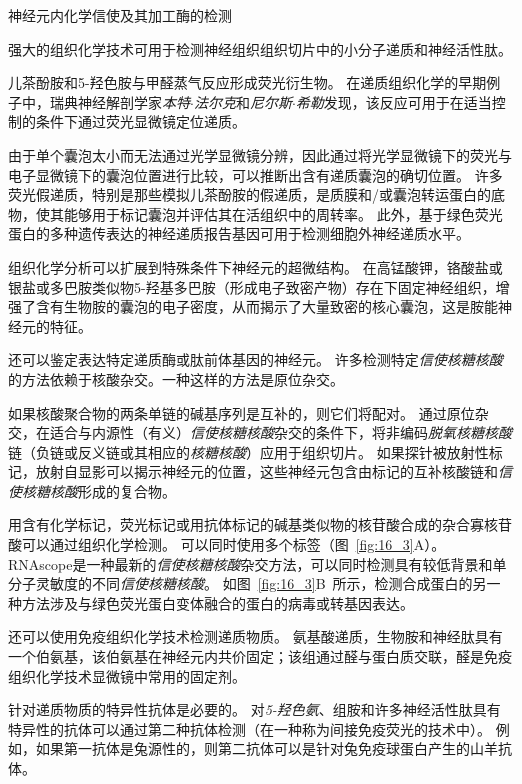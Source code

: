 \begin{proposition}[神经解剖学导航术语] \label{box:16_2}
	
	\quad \quad 神经元内化学信使及其加工酶的检测
	
	\quad \quad 强大的组织化学技术可用于检测神经组织组织切片中的小分子递质和神经活性肽。
	
	\quad \quad 儿茶酚胺和5-羟色胺与甲醛蒸气反应形成荧光衍生物。
	在递质组织化学的早期例子中，瑞典神经解剖学家\textit{本特$\cdot$法尔克}和\textit{尼尔斯$\cdot$希勒}发现，该反应可用于在适当控制的条件下通过荧光显微镜定位递质。
	
	\quad \quad 由于单个囊泡太小而无法通过光学显微镜分辨，因此通过将光学显微镜下的荧光与电子显微镜下的囊泡位置进行比较，可以推断出含有递质囊泡的确切位置。
	许多荧光假递质，特别是那些模拟儿茶酚胺的假递质，是质膜和/或囊泡转运蛋白的底物，使其能够用于标记囊泡并评估其在活组织中的周转率。
	此外，基于绿色荧光蛋白的多种遗传表达的神经递质报告基因可用于检测细胞外神经递质水平。
	
	\quad \quad 组织化学分析可以扩展到特殊条件下神经元的超微结构。
	在高锰酸钾，铬酸盐或银盐或多巴胺类似物5-羟基多巴胺（形成电子致密产物）存在下固定神经组织，增强了含有生物胺的囊泡的电子密度，从而揭示了大量致密的核心囊泡，这是胺能神经元的特征。
	
	\quad \quad 还可以鉴定表达特定递质酶或肽前体基因的神经元。
	许多检测特定\textit{信使核糖核酸}的方法依赖于核酸杂交。一种这样的方法是原位杂交。
	
	\quad \quad 如果核酸聚合物的两条单链的碱基序列是互补的，则它们将配对。
	通过原位杂交，在适合与内源性（有义）\textit{信使核糖核酸}杂交的条件下，将非编码\textit{脱氧核糖核酸}链（负链或反义链或其相应的\textit{核糖核酸}）应用于组织切片。
	如果探针被放射性标记，放射自显影可以揭示神经元的位置，这些神经元包含由标记的互补核酸链和\textit{信使核糖核酸}形成的复合物。
	
	\quad \quad 用含有化学标记，荧光标记或用抗体标记的碱基类似物的核苷酸合成的杂合寡核苷酸可以通过组织化学检测。
	可以同时使用多个标签（图~\ref{fig:16_3}A）。
	RNAscope是一种最新的\textit{信使核糖核酸}杂交方法，可以同时检测具有较低背景和单分子灵敏度的不同\textit{信使核糖核酸}。
	如图~\ref{fig:16_3}B~所示，检测合成蛋白的另一种方法涉及与绿色荧光蛋白变体融合的蛋白的病毒或转基因表达。
	
	\quad \quad 还可以使用免疫组织化学技术检测递质物质。
	氨基酸递质，生物胺和神经肽具有一个伯氨基，该伯氨基在神经元内共价固定；该组通过醛与蛋白质交联，醛是免疫组织化学技术显微镜中常用的固定剂。
	
	\quad \quad 针对递质物质的特异性抗体是必要的。
	对\textit{5-羟色氨}、组胺和许多神经活性肽具有特异性的抗体可以通过第二种抗体检测（在一种称为间接免疫荧光的技术中）。
	例如，如果第一抗体是兔源性的，则第二抗体可以是针对兔免疫球蛋白产生的山羊抗体。
	

\end{proposition}
